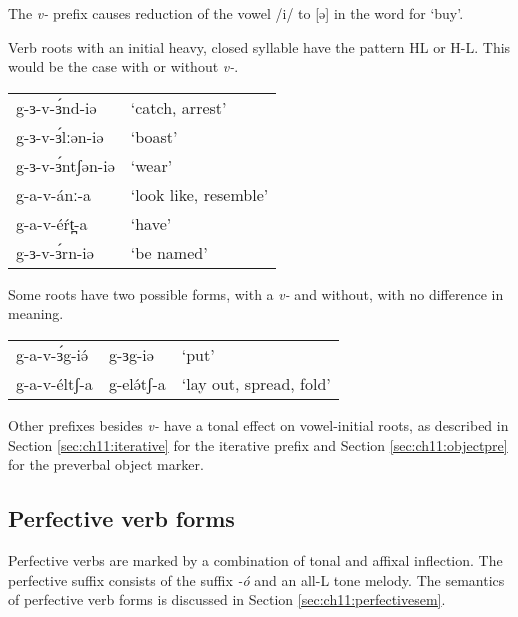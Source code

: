 The \textit{v-} prefix causes reduction of the vowel /i/ to [ə] in the word for ‘buy’.

Verb roots with an initial heavy, closed syllable have the pattern HL or H-L. This would be the case with or without \textit{v-}. 

\ea 
\begin{tabular}[t]{ll}
g-ɜ-v-ɜ́nd-iə		&	`catch, arrest'\\
g-ɜ-v-ɜ́lːən-iə		&	`boast'\\
g-ɜ-v-ɜ́ntʃən-iə		&	`wear'\\
g-a-v-ánː-a			&	`look like, resemble'\\
g-a-v-éŕt̪-a			&	`have'\\
g-ɜ-v-ɜ́rn-iə		&	`be named'\\ 	
\end{tabular}
\z 

Some roots have two possible forms, with a \textit{v-} and without, with no difference in meaning.

\ea 
\begin{tabular}[t]{lll}
g-a-v-ɜ́g-iə́		&	g-ɜg-iə		&	`put'\\
g-a-v-éltʃ-a	&	g-elə́tʃ-a	&	`lay out, spread, fold'\\	
\end{tabular}
\z 

Other prefixes besides \textit{v-} have a tonal effect on vowel-initial roots, as described in Section \ref{sec:ch11:iterative} for the iterative prefix and Section \ref{sec:ch11:objectpre} for the preverbal object marker. 

\subsection{Perfective verb forms}\label{sec:ch11:perfective}

Perfective verbs are marked by a combination of tonal and affixal inflection. The perfective suffix consists of the suffix \textit{-ó} and an all-L tone melody. The semantics of perfective verb forms is discussed in Section \ref{sec:ch11:perfectivesem}. 


